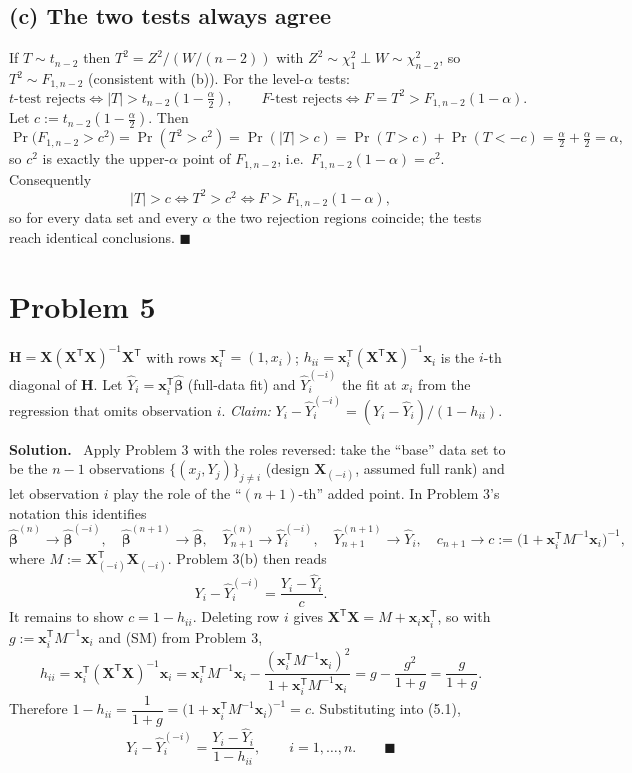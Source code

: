 \documentclass[11pt]{article}
\newcommand{\bX}{\mathbf{X}}
\newcommand{\bH}{\mathbf{H}}
\newcommand{\bx}{\mathbf{x}}
\newcommand{\bbeta}{\bm{\beta}}
\newcommand{\T}{^{\mathsf{T}}}
\newcommand{\inv}{^{-1}}
\newcommand{\bhat}[1]{\widehat{#1}}
\theoremstyle{remark}
\newcommand{\ans}{\medskip\noindent\textbf{Solution.}\ }
\begin{document}
\subsection*{(c) The two tests always agree}

If $T\sim t_{n-2}$ then $T^2=Z^2/(W/(n-2))$ with $Z^2\sim\chi^2_1\perp W\sim\chi^2_{n-2}$, so
$T^2\sim F_{1,n-2}$ (consistent with (b)). For the level-$\alpha$ tests:
\[
\text{$t$-test rejects}\iff |T|>t_{n-2}(1-\tfrac\alpha2),\qquad
\text{$F$-test rejects}\iff F=T^2>F_{1,n-2}(1-\alpha).
\]
Let $c:=t_{n-2}(1-\tfrac\alpha2)$. Then
\[
\Pr\big(F_{1,n-2}>c^2\big)=\Pr(T^2>c^2)=\Pr(|T|>c)
=\Pr(T>c)+\Pr(T<-c)=\tfrac\alpha2+\tfrac\alpha2=\alpha,
\]
so $c^2$ is exactly the upper-$\alpha$ point of $F_{1,n-2}$, i.e.\ $F_{1,n-2}(1-\alpha)=c^2$. Consequently
\[
|T|>c\iff T^2>c^2\iff F>F_{1,n-2}(1-\alpha),
\]
so for every data set and every $\alpha$ the two rejection regions coincide; the tests reach identical
conclusions. \hfill$\blacksquare$

\section*{Problem 5}

$\bH=\bX(\bX\T\bX)\inv\bX\T$ with rows $\bx_i\T=(1,x_i)$; $h_{ii}=\bx_i\T(\bX\T\bX)\inv\bx_i$ is the $i$-th
diagonal of $\bH$. Let $\bhat Y_i=\bx_i\T\bhat{\bbeta}$ (full-data fit) and $\bhat Y_i^{(-i)}$ the fit at
$x_i$ from the regression that omits observation $i$. \emph{Claim:}
$Y_i-\bhat Y_i^{(-i)}=(Y_i-\bhat Y_i)/(1-h_{ii})$.

\ans
Apply Problem 3 with the roles reversed: take the ``base'' data set to be the $n-1$ observations
$\{(x_j,Y_j)\}_{j\ne i}$ (design $\bX_{(-i)}$, assumed full rank) and let observation $i$ play the role of the
``$(n{+}1)$-th'' added point. In Problem 3's notation this identifies
\[
\bhat{\bbeta}^{(n)}\!\to\bhat{\bbeta}^{(-i)},\quad
\bhat{\bbeta}^{(n+1)}\!\to\bhat{\bbeta},\quad
\bhat Y^{(n)}_{n+1}\!\to\bhat Y_i^{(-i)},\quad
\bhat Y^{(n+1)}_{n+1}\!\to\bhat Y_i,\quad
c_{n+1}\!\to c:=\big(1+\bx_i\T M\inv\bx_i\big)\inv,
\]
where $M:=\bX_{(-i)}\T\bX_{(-i)}$. Problem 3(b) then reads
\begin{equation*}
Y_i-\bhat Y_i^{(-i)}=\frac{Y_i-\bhat Y_i}{c}.
\tag{5.1}
\end{equation*}
It remains to show $c=1-h_{ii}$. Deleting row $i$ gives $\bX\T\bX=M+\bx_i\bx_i\T$, so with
$g:=\bx_i\T M\inv\bx_i$ and (SM) from Problem 3,
\[
h_{ii}=\bx_i\T(\bX\T\bX)\inv\bx_i
=\bx_i\T M\inv\bx_i-\frac{(\bx_i\T M\inv\bx_i)^2}{1+\bx_i\T M\inv\bx_i}
=g-\frac{g^2}{1+g}=\frac{g}{1+g}.
\]
Therefore $1-h_{ii}=\dfrac{1}{1+g}=\big(1+\bx_i\T M\inv\bx_i\big)\inv=c$. Substituting into (5.1),
\[
Y_i-\bhat Y_i^{(-i)}=\frac{Y_i-\bhat Y_i}{1-h_{ii}},\qquad i=1,\dots,n. \qquad\blacksquare
\]
\end{document}
